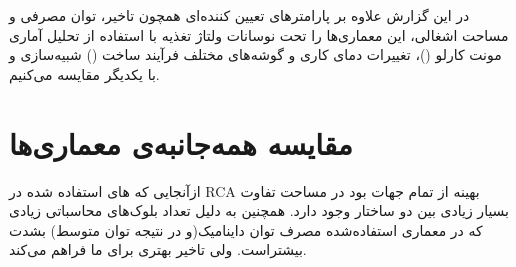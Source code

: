 \documentclass[10pt,a4paper, twoside]{article}
\begin{document}
در این گزارش علاوه بر پارامتر‌های تعیین کننده‌ای همچون تاخیر، توان مصرفی و مساحت اشغالی، این معماری‌ها را تحت نوسانات ولتاژ تغذیه با استفاده از تحلیل آماری مونت کارلو ()، تغییرات دمای کاری و گوشه‌های مختلف فرآیند ساخت () شبیه‌سازی و با یکدیگر مقایسه می‌کنیم.




\section{مقایسه همه‌جانبه‌ی معماری‌ها}
ازآنجایی که های استفاده شده در RCA بهینه از تمام جهات بود در مساحت تفاوت بسیار زیادی بین دو ساختار وجود دارد.
همچنین به دلیل تعداد بلوک‌های محاسباتی زیادی که در معماری  استفاده‌شده مصرف توان داینامیک(و در نتیجه توان متوسط) بشدت بیشتراست.
ولی تاخیر بهتری برای ما فراهم می‌کند.


% 
% 
\end{document}

